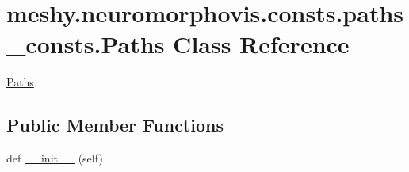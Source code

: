 \hypertarget{classmeshy_1_1neuromorphovis_1_1consts_1_1paths__consts_1_1Paths}{}\section{meshy.\+neuromorphovis.\+consts.\+paths\+\_\+consts.\+Paths Class Reference}
\label{classmeshy_1_1neuromorphovis_1_1consts_1_1paths__consts_1_1Paths}


\hyperlink{classmeshy_1_1neuromorphovis_1_1consts_1_1paths__consts_1_1Paths}{Paths}.  


\subsection*{Public Member Functions}
\begin{DoxyCompactItemize}
\item 
def \hyperlink{classmeshy_1_1neuromorphovis_1_1consts_1_1paths__consts_1_1Paths_a8313a05908ae26314b16f4d0cdd2bb33}{\+\_\+\+\_\+init\+\_\+\+\_\+} (self)\hypertarget{classmeshy_1_1neuromorphovis_1_1consts_1_1paths__consts_1_1Paths_a8313a05908ae26314b16f4d0cdd2bb33}{}\label{classmeshy_1_1neuromorphovis_1_1consts_1_1paths__consts_1_1Paths_a8313a05908ae26314b16f4d0cdd2bb33}

\end{DoxyCompactItemize}
